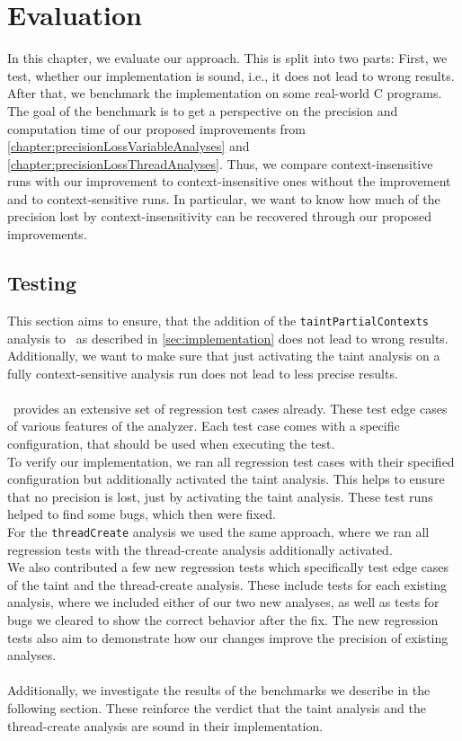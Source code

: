 
\chapter{Evaluation}\label{chapter:evaluation}
  In this chapter, we evaluate our approach. This is split into two parts: First, we test, whether our implementation is sound, i.e., it does not lead to wrong results. After that, we benchmark the implementation on some real-world C programs. The goal of the benchmark is to get a perspective on the precision and computation time of our proposed improvements from \autoref{chapter:precisionLossVariableAnalyses} and \autoref{chapter:precisionLossThreadAnalyses}. Thus, we compare context-insensitive runs with our improvement to context-insensitive ones without the improvement and to context-sensitive runs. In particular, we want to know how much of the precision lost by context-insensitivity can be recovered through our proposed improvements.

  \section{Testing}
    This section aims to ensure, that the addition of the \texttt{taintPartialContexts} analysis to \gob\ as described in \autoref{sec:implementation} does not lead to wrong results. Additionally, we want to make sure that just activating the taint analysis on a fully context-sensitive analysis run does not lead to less precise results.\\
    \\
    \gob\ provides an extensive set of regression test cases already. These test edge cases of various features of the analyzer. Each test case comes with a specific configuration, that should be used when executing the test.\\
    To verify our implementation, we ran all regression test cases with their specified configuration but additionally activated the taint analysis. This helps to ensure that no precision is lost, just by activating the taint analysis. These test runs helped to find some bugs, which then were fixed.\\
    For the \texttt{threadCreate} analysis we used the same approach, where we ran all regression tests with the thread-create analysis additionally activated.\\
    We also contributed a few new regression tests which specifically test edge cases of the taint and the thread-create analysis. These include tests for each existing analysis, where we included either of our two new analyses, as well as tests for bugs we cleared to show the correct behavior after the fix. The new regression tests also aim to demonstrate how our changes improve the precision of existing analyses.\\
    \\
    Additionally, we investigate the results of the benchmarks we describe in the following section. These reinforce the verdict that the taint analysis and the thread-create analysis are sound in their implementation.
  
